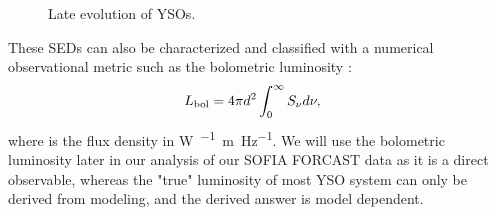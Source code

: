 \begin{figure}
\begin{center}

 \par\medskip
{}
\caption[Late evolution of YSOs]{Late evolution of YSOs.}
\label{fig:LateStages}
\end{center}
\end{figure}


These SEDs can also be characterized and classified with a numerical observational metric such as the bolometric luminosity \citep{Myers:1993en,Dunham:2010bx}:
\begin{align}
L_\textrm{bol} &= 4\pi d^2\int_0^\infty S_\nu d\nu,
\end{align}
where \Snu is the flux density in \si{\watt\per{}\meter\per\hertz}. We will use the bolometric luminosity later in our analysis of our SOFIA FORCAST data as it is a direct observable, whereas the "true" luminosity of most YSO system can only be derived from modeling, and the
derived answer is model dependent.

